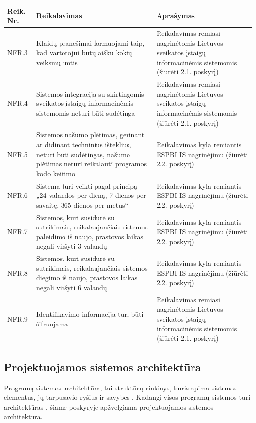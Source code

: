 \begin{table}[!ht]
    \centering
    \renewcommand{\arraystretch}{1.2}
    \renewcommand\thetable{6}

    \begin{tabular}{|m{3em}|m{17em}|m{17em}|}
    \hline 
    \rowcolor[HTML]{EFEFEF} 
    Reik. Nr. & Reikalavimas & Aprašymas \\ \hline
    NFR.3  & Klaidų pranešimai formuojami taip, kad vartotojui būtų aišku kokių veiksmų imtis  &   Reikalavimas remiasi nagrinėtomis Lietuvos sveikatos įstaigų informacinėmis sistemomis (žiūrėti 2.1. poskyrį)       \\ \hline
    NFR.4  &  Sistemos integracija su skirtingomis sveikatos įstaigų informacinėmis sistemomis neturi būti sudėtinga  &   Reikalavimas remiasi nagrinėtomis Lietuvos sveikatos įstaigų informacinėmis sistemomis (žiūrėti 2.1. poskyrį)       \\ \hline
    NFR.5  &  Sistemos našumo plėtimas, gerinant ar didinant techninius išteklius, neturi būti sudėtingas, našumo plėtimas neturi reikalauti programos kodo keitimo  &   Reikalavimas kyla remiantis ESPBI IS nagrinėjimu (žiūrėti 2.2. poskyrį)       \\ \hline
    NFR.6  &   Sistema turi veikti pagal principą „24 valandos per dieną, 7 dienos per savaitę, 365 dienos per metus“  &  Reikalavimas kyla remiantis ESPBI IS nagrinėjimu (žiūrėti 2.2. poskyrį)       \\ \hline
    NFR.7  &  Sistemos, kuri susidūrė su sutrikimais, reikalaujančiais sistemos paleidimo iš naujo, prastovos laikas negali viršyti 3 valandų  &   Reikalavimas kyla remiantis ESPBI IS nagrinėjimu (žiūrėti 2.2. poskyrį)       \\ \hline
    NFR.8  &  Sistemos, kuri susidūrė su sutrikimais, reikalaujančiais sistemos diegimo iš naujo, prastovos laikas negali viršyti 6 valandų  &   Reikalavimas kyla remiantis ESPBI IS nagrinėjimu (žiūrėti 2.2. poskyrį)       \\ \hline
    NFR.9  &  Identifikavimo informacija turi būti šifruojama  &   Reikalavimas remiasi nagrinėtomis Lietuvos sveikatos įstaigų informacinėmis sistemomis (žiūrėti 2.1. poskyrį)       \\ \hline
    \end{tabular}

\end{table}

\subsection{Projektuojamos sistemos architektūra}
Programų sistemos architektūra, tai struktūrų rinkinys, kuris apima sistemos elementus, jų tarpusavio ryšius ir savybes \cite{Bass2013}. Kadangi visos programų sistemos turi architektūras \cite{Bass2013}, šiame poskyryje apžvelgiama projektuojamos sistemos architektūra.

